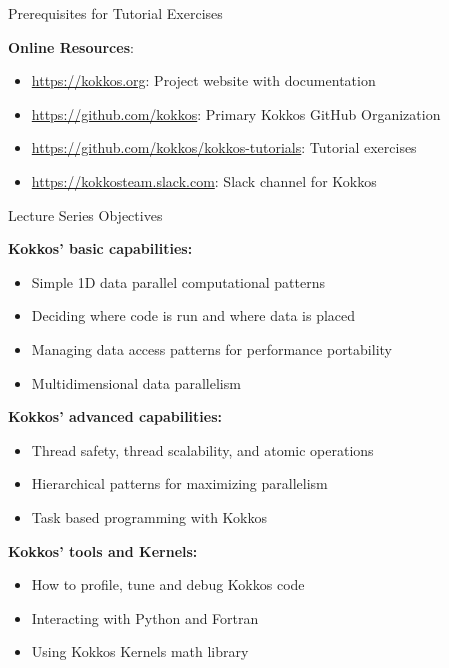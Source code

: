 \begin{frame}{Prerequisites for Tutorial Exercises}

\textbf{Online Resources}:

\begin{itemize}
	\item \url{https://kokkos.org}: Project website with documentation
	\item \url{https://github.com/kokkos}: Primary Kokkos GitHub Organization
	\item \url{https://github.com/kokkos/kokkos-tutorials}: Tutorial exercises
	\item \url{https://kokkosteam.slack.com}: Slack channel for Kokkos
\end{itemize}

\end{frame}



\begin{frame}{Lecture Series Objectives}



  \textbf{Kokkos' basic capabilities:}
  \begin{itemize}
    \item {Simple 1D data parallel computational patterns}
    \item {Deciding where code is run and where data is placed}
    \item {Managing data access patterns for performance portability}
    \item {Multidimensional data parallelism}
  \end{itemize}


  \textbf{Kokkos' advanced capabilities:}
  \begin{itemize}
    \item {Thread safety, thread scalability, and atomic operations}
    \item {Hierarchical patterns for maximizing parallelism}
    \item {Task based programming with Kokkos}
  \end{itemize}


  \textbf{Kokkos' tools and Kernels:}
  \begin{itemize}
    \item {How to profile, tune and debug Kokkos code}
    \item {Interacting with Python and Fortran}
    \item {Using Kokkos Kernels math library}
  \end{itemize}

\end{frame}


